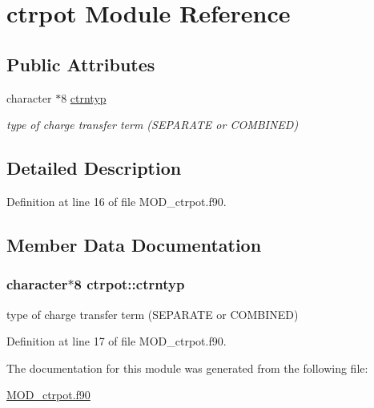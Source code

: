 \hypertarget{classctrpot}{\section{ctrpot Module Reference}
\label{classctrpot}
}
\subsection*{Public Attributes}
\begin{DoxyCompactItemize}
\item 
character $\ast$8 \hyperlink{classctrpot_a67e66cc11d1126231c940290ec4a19af}{ctrntyp}
\begin{DoxyCompactList}\small\item\em type of charge transfer term (S\-E\-P\-A\-R\-A\-T\-E or C\-O\-M\-B\-I\-N\-E\-D) \end{DoxyCompactList}\end{DoxyCompactItemize}


\subsection{Detailed Description}


Definition at line 16 of file M\-O\-D\-\_\-ctrpot.\-f90.



\subsection{Member Data Documentation}
\hypertarget{classctrpot_a67e66cc11d1126231c940290ec4a19af}{
\subsubsection[{ctrntyp}]{\setlength{\rightskip}{0pt plus 5cm}character$\ast$8 ctrpot\-::ctrntyp}}\label{classctrpot_a67e66cc11d1126231c940290ec4a19af}


type of charge transfer term (S\-E\-P\-A\-R\-A\-T\-E or C\-O\-M\-B\-I\-N\-E\-D) 



Definition at line 17 of file M\-O\-D\-\_\-ctrpot.\-f90.



The documentation for this module was generated from the following file\-:\begin{DoxyCompactItemize}
\item 
\hyperlink{MOD__ctrpot_8f90}{M\-O\-D\-\_\-ctrpot.\-f90}\end{DoxyCompactItemize}
